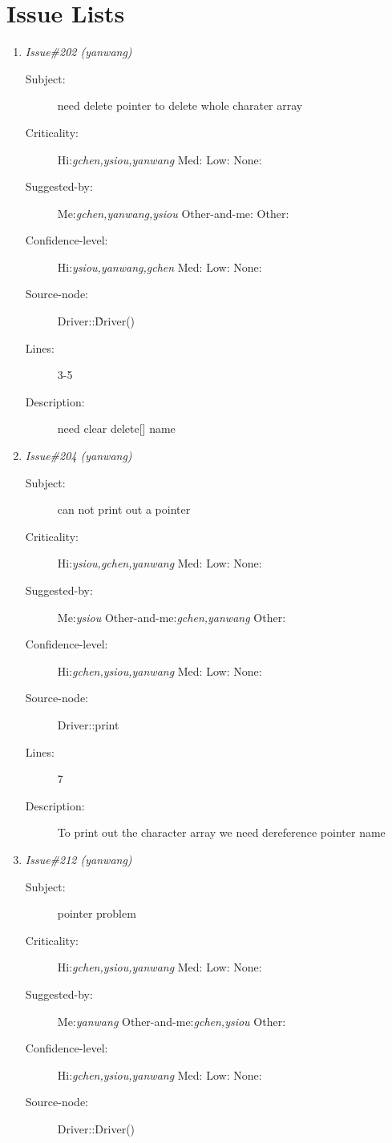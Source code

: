 \section{Issue Lists}
\begin{enumerate}
\item {\it Issue\#202 (yanwang)}
\begin{description}
\item [Subject:] need delete pointer to delete whole charater array
\item [Criticality:] Hi:{\it gchen,ysiou,yanwang} Med:{\it } Low:{\it } None:{\it }
\item [Suggested-by:] Me:{\it gchen,yanwang,ysiou} Other-and-me:{\it } Other:{\it }
\item [Confidence-level:] Hi:{\it ysiou,yanwang,gchen} Med:{\it } Low:{\it } None:{\it }
\item [Source-node:] Driver::\~Driver()

\item [Lines:] 3-5

\item [Description:] need clear delete[] name
\end{description}
\item {\it Issue\#204 (yanwang)}
\begin{description}
\item [Subject:] can not print out a pointer
\item [Criticality:] Hi:{\it ysiou,gchen,yanwang} Med:{\it } Low:{\it } None:{\it }
\item [Suggested-by:] Me:{\it ysiou} Other-and-me:{\it gchen,yanwang} Other:{\it }
\item [Confidence-level:] Hi:{\it gchen,ysiou,yanwang} Med:{\it } Low:{\it } None:{\it }
\item [Source-node:] Driver::print

\item [Lines:] 7

\item [Description:] To print out the character array we need dereference pointer name
\end{description}
\item {\it Issue\#212 (yanwang)}
\begin{description}
\item [Subject:] pointer problem
\item [Criticality:] Hi:{\it gchen,ysiou,yanwang} Med:{\it } Low:{\it } None:{\it }
\item [Suggested-by:] Me:{\it yanwang} Other-and-me:{\it gchen,ysiou} Other:{\it }
\item [Confidence-level:] Hi:{\it gchen,ysiou,yanwang} Med:{\it } Low:{\it } None:{\it }
\item [Source-node:] Driver::Driver()


\end{description}
\end{enumerate}
